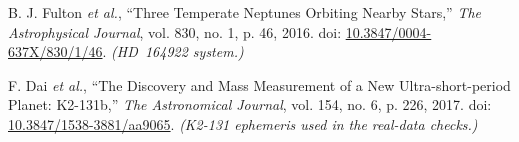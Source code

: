 \documentclass[11pt,a4paper]{article}
\begin{document}
\begin{enumerate}[label={[\arabic*]}, leftmargin=2.2em, itemsep=0.7em]
  \item B. J. Fulton \textit{et al.},
  ``Three Temperate Neptunes Orbiting Nearby Stars,''
  \textit{The Astrophysical Journal}, vol. 830, no. 1, p. 46, 2016.
  doi: \href{https://doi.org/10.3847/0004-637X/830/1/46}
  {10.3847/0004-637X/830/1/46}.
  \textit{(HD~164922 system.)}

  \item F. Dai \textit{et al.},
  ``The Discovery and Mass Measurement of a New Ultra-short-period Planet:
  K2-131b,''
  \textit{The Astronomical Journal}, vol. 154, no. 6, p. 226, 2017.
  doi: \href{https://doi.org/10.3847/1538-3881/aa9065}
  {10.3847/1538-3881/aa9065}.
  \textit{(K2-131 ephemeris used in the real-data checks.)}

\end{enumerate}
\endgroup
\end{document}
